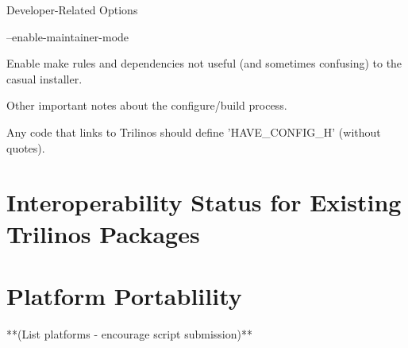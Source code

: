 \documentclass[12pt,relax]{TrilinosDevGuide}
\begin{document}
   Developer-Related Options

\bullet --enable-maintainer-mode 

Enable make rules and dependencies not useful (and sometimes confusing) to the 
casual installer.

\triangleright Other important notes about the configure/build process.

\circ Any code that links to Trilinos should define 'HAVE_CONFIG_H' (without
quotes).

	\chapter{Interoperability Status for Existing Trilinos Packages}

	\chapter{Platform Portablility}
	**(List platforms - encourage script submission)**
    \clearpage
    
    

\end{document}
